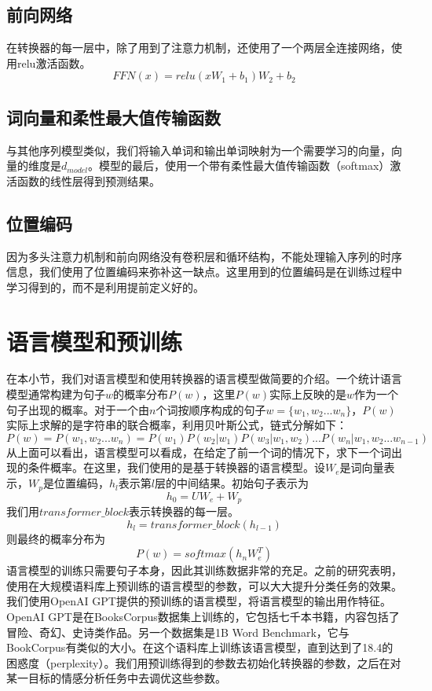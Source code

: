 \subsection{前向网络}
在转换器的每一层中，除了用到了注意力机制，还使用了一个两层全连接网络，使用relu激活函数。
\begin{equation}
    FFN(x)=relu(xW_1+b_1)W_2+b_2
\end{equation}
\subsection{词向量和柔性最大值传输函数}
与其他序列模型类似，我们将输入单词和输出单词映射为一个需要学习的向量，向量的维度是$d_{model}$。模型的最后，使用一个带有柔性最大值传输函数（softmax）激活函数的线性层得到预测结果。
\subsection{位置编码}
因为多头注意力机制和前向网络没有卷积层和循环结构，不能处理输入序列的时序信息，我们使用了位置编码来弥补这一缺点。这里用到的位置编码是在训练过程中学习得到的，而不是利用提前定义好的\cite{radford2018improving}。
\section{语言模型和预训练}

在本小节，我们对语言模型和使用转换器的语言模型做简要的介绍。一个统计语言模型通常构建为句子$w$的概率分布$P(w)$，这里$P(w)$实际上反映的是$w$作为一个句子出现的概率。对于一个由$n$个词按顺序构成的句子$w=\{w_1,w_2...w_n\}$，$P(w)$实际上求解的是字符串的联合概率，利用贝叶斯公式，链式分解如下：
\begin{equation}
    P(w)=P(w_1,w_2...w_n)=P(w_1)P(w_2|w_1)P(w_3|w_1,w_2)...P(w_n|w_1,w_2...w_{n-1})
\end{equation}
从上面可以看出，语言模型可以看成，在给定了前一个词的情况下，求下一个词出现的条件概率。在这里，我们使用的是基于转换器的语言模型。设$W_e$是词向量表示，$W_p$是位置编码，$h_l$表示第$l$层的中间结果。初始句子表示为
\begin{equation}
    h_0=UW_e+W_p
\end{equation}
我们用$transformer\_block$表示转换器的每一层。
\begin{equation}
    h_l=transformer\_block(h_{l-1})
\end{equation}
则最终的概率分布为
\begin{equation}
    P(w)=softmax(h_nW^T_e)
\end{equation}
语言模型的训练只需要句子本身，因此其训练数据非常的充足。之前的研究\cite{DBLP:conf/naacl/PetersNIGCLZ18,DBLP:journals/corr/abs-1810-04805,radford2018improving}表明，使用在大规模语料库上预训练的语言模型的参数，可以大大提升分类任务的效果。我们使用OpenAI GPT\cite{radford2018improving}提供的预训练的语言模型，将语言模型的输出用作特征。OpenAI GPT是在BooksCorpus数据集上训练的，它包括七千本书籍，内容包括了冒险、奇幻、史诗类作品。另一个数据集是1B
Word Benchmark\cite{Zhu2015Aligning}，它与BookCorpus有类似的大小。在这个语料库上训练该语言模型，直到达到了18.4的困惑度（perplexity）。我们用预训练得到的参数去初始化转换器的参数，之后在对某一目标的情感分析任务中去调优这些参数。

